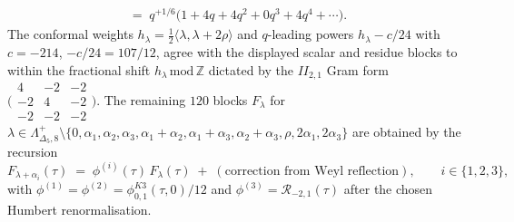 \begin{theorem}
\begin{align}
 \;=\;q^{+1/6}\bigl(1 + 4q + 4q^2 + 0q^3 + 4q^4 + \cdots\bigr).
 \label{eq:modbootstrap-explicit-F2a3}
\end{align}
The conformal weights $h_\lambda =
\tfrac{1}{2}\langle\lambda,\lambda + 2\rho\rangle$ and
$q$-leading powers $h_\lambda - c/24$ with $c = -214$,
$-c/24 = 107/12$, agree with the displayed scalar and residue blocks
to within the fractional shift $h_\lambda\,\mathrm{mod}\,\mathbb Z$
dictated by the $II_{2,1}$ Gram form
$\bigl(\begin{smallmatrix}4 & -2 & -2\\-2 & 4 & -2\\
-2 & -2 & -2\end{smallmatrix}\bigr)$.
The remaining $120$ blocks $F_\lambda$ for
$\lambda\in\Lambda^{+}_{\Delta_5, 8}\setminus
\{0,\alpha_1,\alpha_2,\alpha_3,\alpha_1+\alpha_2,
\alpha_1+\alpha_3,\alpha_2+\alpha_3,\rho,2\alpha_1,2\alpha_3\}$
are obtained by the recursion
\[
 F_{\lambda + \alpha_i}(\tau)
 \;=\;
 \phi^{(i)}(\tau)\,F_\lambda(\tau)
 \;+\;
 (\text{correction from Weyl reflection}),
 \qquad
 i\in\{1, 2, 3\},
\]
with $\phi^{(1)} = \phi^{(2)} = \phi_{0,1}^{K3}(\tau,0)/12$ and
$\phi^{(3)} = \mathcal R_{-2,1}(\tau)$ after the chosen Humbert
renormalisation.
\end{theorem}

